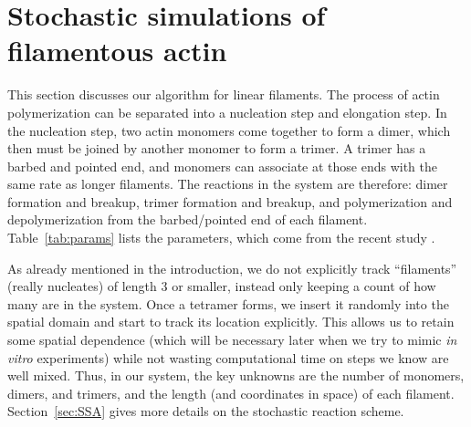 \documentclass[11pt]{article}
\begin{document}
\section{Stochastic simulations of filamentous actin \label{sec:FilAct}}
This section discusses our algorithm for linear filaments. The process of actin polymerization can be separated into a nucleation step and elongation step. In the nucleation step, two actin monomers come together to form a dimer, which then must be joined by another monomer to form a trimer. A trimer has a barbed and pointed end, and monomers can associate at those ends with the same rate as longer filaments. The reactions in the system are therefore: dimer formation and breakup, trimer formation and breakup, and polymerization and depolymerization from the barbed/pointed end of each filament. Table\ \ref{tab:params} lists the parameters, which come from the recent study \cite{rosenbloom2021mechanism}.

As already mentioned in the introduction, we do not explicitly track ``filaments'' (really nucleates) of length 3 or smaller, instead only keeping a count of how many are in the system. Once a tetramer forms, we insert it randomly into the spatial domain and start to track its location explicitly. This allows us to retain some spatial dependence (which will be necessary later when we try to mimic \emph{in vitro} experiments) while not wasting computational time on steps we know are well mixed. Thus, in our system, the key unknowns are the number of monomers, dimers, and trimers, and the length (and coordinates in space) of each filament. Section\ \ref{sec:SSA} gives more details on the stochastic reaction scheme. 
\end{document}
